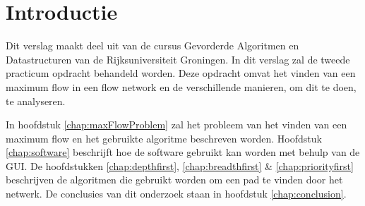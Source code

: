 \chapter{Introductie}

Dit verslag maakt deel uit van de cursus Gevorderde Algoritmen en Datastructuren van de Rijksuniversiteit Groningen. 
In dit verslag zal de tweede practicum opdracht behandeld worden. 
Deze opdracht omvat het vinden van een maximum flow in een flow network en de verschillende manieren, om dit te doen, te analyseren.

In hoofdstuk \ref{chap:maxFlowProblem} zal het probleem van het vinden van een maximum flow en het gebruikte algoritme beschreven worden. Hoofdstuk \ref{chap:software} beschrijft hoe de software gebruikt kan worden met behulp van de GUI. De hoofdstukken \ref{chap:depthfirst}, \ref{chap:breadthfirst} \& \ref{chap:priorityfirst} beschrijven de algoritmen die gebruikt worden om een pad te vinden door het netwerk. De conclusies van dit onderzoek staan in hoofdstuk \ref{chap:conclusion}.